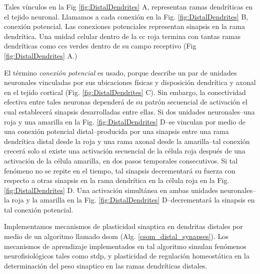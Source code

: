 {Tales vínculos en la Fig \ref{fig:DistalDendrites} A, representan ramas dendríticas en el tejido neuronal.
Llamamos a cada conexión en la Fig. \ref{fig:DistalDendrites} B, conexión potencial.
Las conexiones potenciales representan sinapsis en la rama dendrítica.
Una unidad celular dentro de la \gls{cc} roja termina con tantas ramas dendríticas como \glspl{cc} verdes dentro de su campo receptivo (Fig \ref{fig:DistalDendrites} A.)

El término \emph{conexión potencial} es usado, porque describe un par de unidades neuronales vinculadas por sus ubicaciones físicas y disposición dendrítica y axonal en el tejido cortical (Fig. \ref{fig:DistalDendrites} C). Sin embargo, la conectividad efectiva entre tales neuronas dependerá de su patrón secuencial de activación el cual establecerá sinapsis desarrolladas entre ellas. 
Si dos unidades neuronales--una roja y una amarilla en la Fig. \ref{fig:DistalDendrites} D--se vinculan por medio de una conexión potencial distal--producida por una sinapsis entre una rama dendrítica distal desde la roja y una rama axonal desde la amarilla--tal conexión crecerá solo si existe una activación secuencial de la célula roja después de una activación de la célula amarilla, en dos pasos temporales consecutivos.
Si tal fenómeno no se repite en el tiempo, tal sinapsis decrementará su fuerza con respecto a otras sinapsis en la rama dendrítica en la célula roja en la Fig. \ref{fig:DistalDendrites} D.
Una activación simultánea en ambas unidades neuronales--la roja y la amarilla en la Fig. \ref{fig:DistalDendrites} D--decrementará la sinapsis en tal conexión potencial.

Implementamos mecanismos de plasticidad sinaptica en dendritas distales por medio de un algoritmo llamado \gls{dsom} (Alg. \ref{csom_distal_synapses}).
Los mecanismos de aprendizaje implementados en tal algoritmo simulan fenómenos neurofisiológicos
tales como \gls{stdp}, y plasticidad de regulación homeostática en la determinación del peso sinaptico en las ramas dendríticas distales.

}
